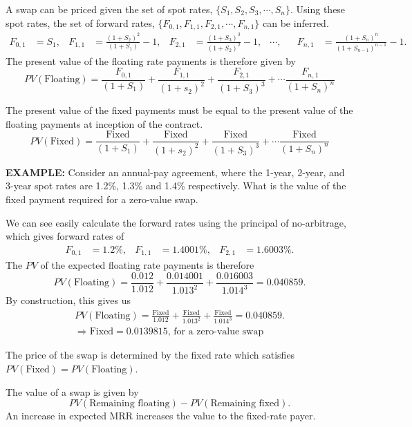 \documentclass[../notes_compiled.tex]{subfiles}
\begin{document}
\begin{itemize}
\item A swap can be priced given the set of spot rates, $\{S_{1}, S_{2}, S_{3}, \cdots, S_{n}\}$. Using these spot rates, the set of forward rates, $\{F_{0,1}, F_{1,1}, F_{2,1}, \cdots, F_{n,1}\}$ can be inferred.
{\small
\begin{align*}
F_{0,1}&=S_{1}, & F_{1,1} &=\frac{(1+S_{2})^{2}}{(1+S_{1})} - 1, & F_{2,1} &= \frac{(1 + S_{3})^{3}}{(1 + S_{2})^{2}} -1,  & \cdots, & &F_{n,1} &= \frac{(1 + S_{n})^{n}}{(1 + S_{n-1})^{n-1}} -1.
\end{align*}
}
The present value of the floating rate payments is therefore given by
\begin{equation}
PV(\text{Floating}) = \frac{F_{0,1}}{(1 + S_{1})} + \frac{F_{1,1}}{(1 + s_{2})^{2}} + \frac{F_{2,1}}{(1 + S_{3})^{3}} + \cdots \frac{F_{n,1}}{(1 + S_{n})^{n}}
\end{equation}

The present value of the fixed payments must be equal to the present value of the floating payments at inception of the contract.
\begin{equation}
PV(\text{Fixed}) = \frac{\text{Fixed}}{(1 + S_{1})} + \frac{\text{Fixed}}{(1 + s_{2})^{2}} + \frac{\text{Fixed}}{(1 + S_{3})^{3}} + \cdots \frac{\text{Fixed}}{(1 + S_{n})^{n}}
\end{equation}
{\color{RedViolet}
\item[] \textbf{EXAMPLE:} Consider an annual-pay agreement, where the 1-year, 2-year, and 3-year spot rates are 1.2\%, 1.3\% and 1.4\% respectively. What is the value of the fixed payment required for a zero-value swap.
}
{\color{RoyalBlue}
\item[] We can see easily calculate the forward rates using the principal of no-arbitrage, which gives forward rates of
\begin{align*}
F_{0,1}&=1.2\%, & F_{1,1} &=1.4001\%, & F_{2,1} &= 1.6003\%.
\end{align*}
The $PV$ of the expected floating rate payments is therefore
\begin{equation*}
PV(\text{Floating}) = \frac{0.012}{1.012} + \frac{0.014001}{1.013^{2}} + \frac{0.016003}{1.014^{3}} = 0.040859.
\end{equation*}
By construction, this gives us
\begin{gather*}
PV(\text{Floating}) = \frac{\text{Fixed}}{1.012} + \frac{\text{Fixed}}{1.013^{2}} + \frac{\text{Fixed}}{1.014^{3}} = 0.040859. \\
\Rightarrow \text{Fixed} = 0.0139815\text{, for a zero-value swap}
\end{gather*}
}
\item The price of the swap is determined by the fixed rate which satisfies $PV(\text{Fixed}) = PV(\text{Floating})$.
\item The value of a swap is given by
\begin{equation}
PV(\text{Remaining floating}) - PV(\text{Remaining fixed}).
\end{equation}
An increase in expected MRR increases the value to the fixed-rate payer.
\end{itemize}
\end{document}

